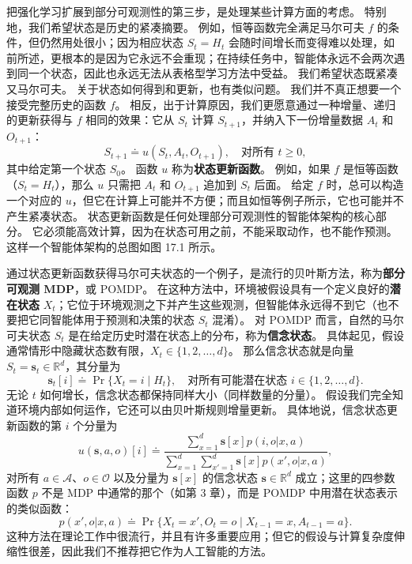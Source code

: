 \documentclass[UTF8, 12pt, fontset=fandol, oneside]{ctexart}
\begin{document}
把强化学习扩展到部分可观测性的第三步，是处理某些计算方面的考虑。
特别地，我们希望状态是历史的紧凑摘要。
例如，恒等函数完全满足马尔可夫 $f$ 的条件，但仍然用处很小；因为相应状态 $S_t=H_t$ 会随时间增长而变得难以处理，如前所述，更根本的是因为它永远不会重现；在持续任务中，智能体永远不会两次遇到同一个状态，因此也永远无法从表格型学习方法中受益。
我们希望状态既紧凑又马尔可夫。
关于状态如何得到和更新，也有类似问题。
我们并不真正想要一个接受完整历史的函数 $f$。
相反，出于计算原因，我们更愿意通过一种增量、递归的更新获得与 $f$ 相同的效果：它从 $S_t$ 计算 $S_{t+1}$，并纳入下一份增量数据 $A_t$ 和 $O_{t+1}$：
\begin{equation}
S_{t+1}\doteq u(S_t,A_t,O_{t+1}),\quad \text{对所有 }t\ge 0,
\tag{17.8}
\end{equation}
其中给定第一个状态 $S_0$。
函数 $u$ 称为\textbf{状态更新函数}。
例如，如果 $f$ 是恒等函数（$S_t=H_t$），那么 $u$ 只需把 $A_t$ 和 $O_{t+1}$ 追加到 $S_t$ 后面。
给定 $f$ 时，总可以构造一个对应的 $u$，但它在计算上可能并不方便；而且如恒等例子所示，它也可能并不产生紧凑状态。
状态更新函数是任何处理部分可观测性的智能体架构的核心部分。
它必须能高效计算，因为在状态可用之前，不能采取动作，也不能作预测。
这样一个智能体架构的总图如图 17.1 所示。

通过状态更新函数获得马尔可夫状态的一个例子，是流行的贝叶斯方法，称为\textbf{部分可观测 MDP}，或 POMDP。
在这种方法中，环境被假设具有一个定义良好的\textbf{潜在状态} $X_t$；它位于环境观测之下并产生这些观测，但智能体永远得不到它（也不要把它同智能体用于预测和决策的状态 $S_t$ 混淆）。
对 POMDP 而言，自然的马尔可夫状态 $S_t$ 是在给定历史时潜在状态上的分布，称为\textbf{信念状态}。
具体起见，假设通常情形中隐藏状态数有限，$X_t\in\{1,2,\ldots,d\}$。
那么信念状态就是向量 $S_t=\mathbf{s}_t\in\mathbb{R}^d$，其分量为
\[
\mathbf{s}_t[i]\doteq \Pr\{X_t=i\mid H_t\},
\quad \text{对所有可能潜在状态 }i\in\{1,2,\ldots,d\}.
\]
无论 $t$ 如何增长，信念状态都保持同样大小（同样数量的分量）。
假设我们完全知道环境内部如何运作，它还可以由贝叶斯规则增量更新。
具体地说，信念状态更新函数的第 $i$ 个分量为
\begin{equation}
u(\mathbf{s},a,o)[i]\doteq
\frac{\sum_{x=1}^{d}\mathbf{s}[x]p(i,o|x,a)}
{\sum_{x=1}^{d}\sum_{x'=1}^{d}\mathbf{s}[x]p(x',o|x,a)},
\tag{17.9}
\end{equation}
对所有 $a\in\mathcal{A}$、$o\in\mathcal{O}$ 以及分量为 $\mathbf{s}[x]$ 的信念状态 $\mathbf{s}\in\mathbb{R}^d$ 成立；这里的四参数函数 $p$ 不是 MDP 中通常的那个（如第 3 章），而是 POMDP 中用潜在状态表示的类似函数：
\[
p(x',o|x,a)\doteq \Pr\{X_t=x',O_t=o\mid X_{t-1}=x,A_{t-1}=a\}.
\]
这种方法在理论工作中很流行，并且有许多重要应用；但它的假设与计算复杂度伸缩性很差，因此我们不推荐把它作为人工智能的方法。
\end{document}
